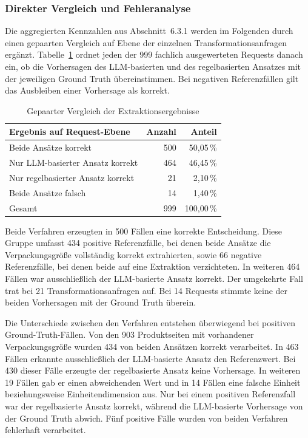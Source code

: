 \subsubsection{Direkter Vergleich und Fehleranalyse}

Die aggregierten Kennzahlen aus Abschnitt~6.3.1 werden im Folgenden durch einen gepaarten Vergleich auf Ebene der einzelnen Transformationsanfragen ergänzt. Tabelle~\ref{tab:gepaarter-vergleich} ordnet jeden der 999 fachlich ausgewerteten Requests danach ein, ob die Vorhersagen des LLM-basierten und des regelbasierten Ansatzes mit der jeweiligen Ground Truth übereinstimmen. Bei negativen Referenzfällen gilt das Ausbleiben einer Vorhersage als korrekt.

\begin{table}[htbp]
    \centering
    \small
    \begin{tabular}{p{} r r}
        \hline
        \textbf{Ergebnis auf Request-Ebene} &
        \textbf{Anzahl} &
        \textbf{Anteil} \\
        \hline
        Beide Ansätze korrekt & 500 & 50,05\,\% \\
        Nur LLM-basierter Ansatz korrekt & 464 & 46,45\,\% \\
        Nur regelbasierter Ansatz korrekt & 21 & 2,10\,\% \\
        Beide Ansätze falsch & 14 & 1,40\,\% \\
        \hline
        Gesamt & 999 & 100,00\,\% \\
        \hline
    \end{tabular}
    \caption{Gepaarter Vergleich der Extraktionsergebnisse}
    \label{tab:gepaarter-vergleich}
\end{table}

Beide Verfahren erzeugten in 500 Fällen eine korrekte Entscheidung. Diese Gruppe umfasst 434 positive Referenzfälle, bei denen beide Ansätze die Verpackungsgröße vollständig korrekt extrahierten, sowie 66 negative Referenzfälle, bei denen beide auf eine Extraktion verzichteten. In weiteren 464 Fällen war ausschließlich der LLM-basierte Ansatz korrekt. Der umgekehrte Fall trat bei 21 Transformationsanfragen auf. Bei 14 Requests stimmte keine der beiden Vorhersagen mit der Ground Truth überein.

Die Unterschiede zwischen den Verfahren entstehen überwiegend bei positiven Ground-Truth-Fällen. Von den 903 Produktseiten mit vorhandener Verpackungsgröße wurden 434 von beiden Ansätzen korrekt verarbeitet. In 463 Fällen erkannte ausschließlich der LLM-basierte Ansatz den Referenzwert. Bei 430 dieser Fälle erzeugte der regelbasierte Ansatz keine Vorhersage. In weiteren 19 Fällen gab er einen abweichenden Wert und in 14 Fällen eine falsche Einheit beziehungsweise Einheitendimension aus. Nur bei einem positiven Referenzfall war der regelbasierte Ansatz korrekt, während die LLM-basierte Vorhersage von der Ground Truth abwich. Fünf positive Fälle wurden von beiden Verfahren fehlerhaft verarbeitet.

